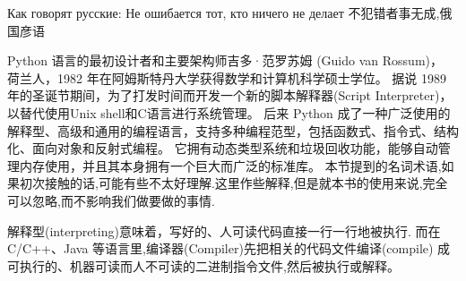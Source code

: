 \documentclass[main.tex]{subfiles}
\begin{document}
	Как говорят русские: Не ошибается тот, кто ничего не делает
不犯错者事无成,俄国彦语

Python 语言的最初设计者和主要架构师吉多·范罗苏姆 (Guido van Rossum)， 荷兰人，1982 年在阿姆斯特丹大学获得数学和计算机科学硕士学位。
据说 1989 年的圣诞节期间，为了打发时间而开发一个新的脚本解释器(Script Interpreter)，以替代使用Unix shell和C语言进行系统管理。
后来 Python 成了一种广泛使用的解释型、高级和通用的编程语言，支持多种编程范型，包括函数式、指令式、结构化、面向对象和反射式编程。
它拥有动态类型系统和垃圾回收功能，能够自动管理内存使用，并且其本身拥有一个巨大而广泛的标准库。
本节提到的名词术语,如果初次接触的话,可能有些不太好理解.这里作些解释,但是就本书的使用来说,完全可以忽略,而不影响我们做要做的事情.

解释型(interpreting)意味着，写好的、人可读代码直接一行一行地被执行. 而在 C/C++、Java 等语言里,编译器(Compiler)先把相关的代码文件编译(compile)
成可执行的、机器可读而人不可读的二进制指令文件,然后被执行或解释。
\end{document}
